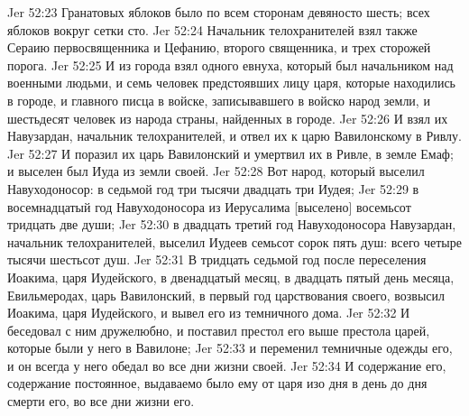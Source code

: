 Jer 52:23  Гранатовых яблоков было по всем сторонам девяносто шесть; всех яблоков вокруг сетки сто.
Jer 52:24  Начальник телохранителей взял также Сераию первосвященника и Цефанию, второго священника, и трех сторожей порога.
Jer 52:25  И из города взял одного евнуха, который был начальником над военными людьми, и семь человек предстоявших лицу царя, которые находились в городе, и главного писца в войске, записывавшего в войско народ земли, и шестьдесят человек из народа страны, найденных в городе.
Jer 52:26  И взял их Навузардан, начальник телохранителей, и отвел их к царю Вавилонскому в Ривлу.
Jer 52:27  И поразил их царь Вавилонский и умертвил их в Ривле, в земле Емаф; и выселен был Иуда из земли своей.
Jer 52:28  Вот народ, который выселил Навуходоносор: в седьмой год три тысячи двадцать три Иудея;
Jer 52:29  в восемнадцатый год Навуходоносора из Иерусалима [выселено] восемьсот тридцать две души;
Jer 52:30  в двадцать третий год Навуходоносора Навузардан, начальник телохранителей, выселил Иудеев семьсот сорок пять душ: всего четыре тысячи шестьсот душ.
Jer 52:31  В тридцать седьмой год после переселения Иоакима, царя Иудейского, в двенадцатый месяц, в двадцать пятый день месяца, Евильмеродах, царь Вавилонский, в первый год царствования своего, возвысил Иоакима, царя Иудейского, и вывел его из темничного дома.
Jer 52:32  И беседовал с ним дружелюбно, и поставил престол его выше престола царей, которые были у него в Вавилоне;
Jer 52:33  и переменил темничные одежды его, и он всегда у него обедал во все дни жизни своей.
Jer 52:34  И содержание его, содержание постоянное, выдаваемо было ему от царя изо дня в день до дня смерти его, во все дни жизни его.


